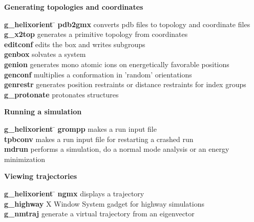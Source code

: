 \begin{description}
\item {\large\bf Generating topologies and coordinates}
\vspace{-2ex}\begin{tabbing}
{\bf g_helixorient} \= \kill
{\bf pdb2gmx} \> converts pdb files to topology and coordinate files \\
{\bf g_x2top} \> generates a primitive topology from coordinates  \\
{\bf editconf} \> edits the box and writes subgroups  \\
{\bf genbox} \> solvates a system \\
{\bf genion} \> generates mono atomic ions on energetically favorable positions \\
{\bf genconf} \> multiplies a conformation in 'random' orientations \\
{\bf genrestr} \> generates position restraints or distance restraints for index groups \\
{\bf g_protonate} \> protonates structures \\
\end{tabbing}\vspace{-2ex}

\item {\large\bf Running a simulation}
\vspace{-2ex}\begin{tabbing}
{\bf g_helixorient} \= \kill
{\bf grompp} \> makes a run input file \\
{\bf tpbconv} \> makes a run input file for restarting a crashed run \\
{\bf mdrun} \> performs a simulation, do a normal mode analysis or an energy minimization \\
\end{tabbing}\vspace{-2ex}

\item {\large\bf Viewing trajectories}
\vspace{-2ex}\begin{tabbing}
{\bf g_helixorient} \= \kill
{\bf ngmx} \> displays a trajectory \\
{\bf g_highway} \> X Window System gadget for highway simulations \\
{\bf g_nmtraj} \> generate a virtual trajectory from an eigenvector \\
\end{tabbing}\vspace{-2ex}


\end{description}
